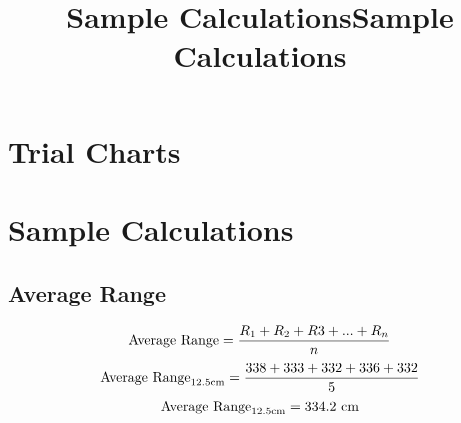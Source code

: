 \newpage
\appendix
\title{Sample Calculations}
\section{Trial Charts}









\title{Sample Calculations}
\section{Sample Calculations}
\subsection{Average Range}
\label{sampleCalc}
\begin{equation}
        \textup{Average Range} = \frac{R_{1} + R_{2} + R{3} + ... + R_{n}}{n}
\end{equation}
\begin{equation}
    \textup{Average Range}_{12.5\textup{cm}} = \frac{338 + 333 + 332 + 336 + 332}{5}
\end{equation}
\begin{equation}
    \textup{Average Range}_{12.5\textup{cm}} = 334.2 \textup{ cm}%
\end{equation}
